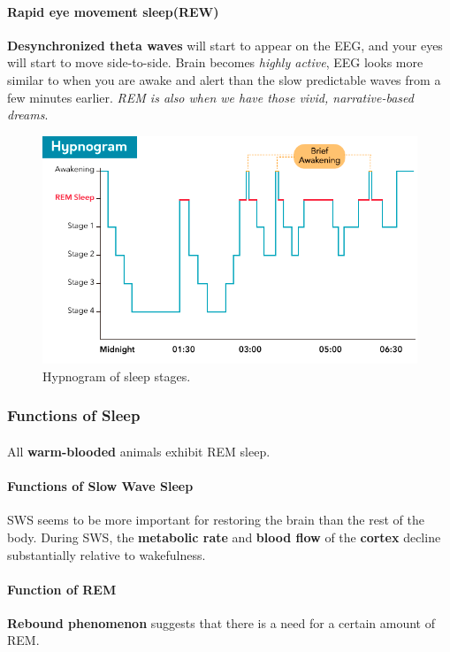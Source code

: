 \documentclass{article}
\begin{document}
	\paragraph{Rapid eye movement sleep(REW)} \textbf{Desynchronized theta waves} will start to appear on the EEG, and your eyes will start to move side-to-side. Brain becomes \emph{highly active}, EEG looks more similar to when you are awake and alert than the slow predictable waves from a few minutes earlier. \emph{REM is also when we have those vivid, narrative-based dreams}.
	\begin{figure}
		\centering
		\includegraphics[width=\linewidth]{pic/hypnogram}
		\caption{Hypnogram of sleep stages.} 
	\end{figure}
	\subsubsection{Functions of Sleep}
	\paragraph{} All \textbf{warm-blooded} animals exhibit REM sleep.
	\paragraph{Functions of Slow Wave Sleep} SWS seems to be more important for restoring the brain than the rest of the body. During SWS, the \textbf{metabolic rate} and \textbf{blood flow} of the \textbf{cortex} decline substantially relative to wakefulness.
	\paragraph{Function of REM} \textbf{Rebound phenomenon} suggests that there is a need for a certain amount of REM.
\end{document}

